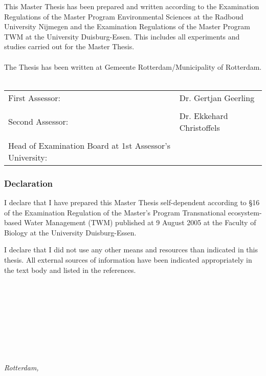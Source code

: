 \newpage
This Master Thesis has been prepared and written according to the Examination Regulations of the Master Program Environmental Sciences at the Radboud University Nijmegen and the Examination Regulations of the Master Program TWM at the University Duisburg-Essen. This includes all experiments and studies carried out for the Master Thesis. \\
\\
The Thesis has been written at Gemeente Rotterdam/Municipality of Rotterdam. \\
\\

\begin{tabular}{ll}
    First Assessor: & Dr. Gertjan Geerling\\
    \\
    Second Assessor: & Dr. Ekkehard Christoffels \\
    \\
    Head of Examination Board at 1st Assessor's University: &                     \\
\end{tabular}
\newpage
\subsubsection{Declaration}
I declare that I have prepared this Master Thesis self-dependent according to §16 of the Examination Regulation of the Master's Program Transnational ecosystem-based Water Management (TWM) published at 9 August 2005 at the Faculty of Biology at the University Duisburg-Essen. 

I declare that I did not use any other means and resources than indicated in this thesis. All external sources of information have been indicated appropriately in the text body and listed in the references. \\
\\
\\
\\
\\
\\
\\
\\
\begin{flushright}
{\makeatletter\itshape
    \@author \\
    Rotterdam, \monthname{} \the\year{}
\makeatother}
\end{flushright}








